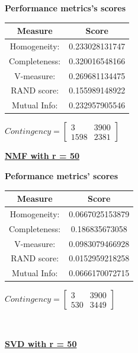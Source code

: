 \documentclass{report}
\begin{document}
\begin{center}
	\textbf{Performance metrics's scores} \\ \vspace{10pt}
	\begin{tabular}{*{2}{c}}
		\toprule
		\textbf{Measure} & \textbf{Score} \\
		\midrule
		Homogeneity: & 0.233028131747 \\
		\midrule
		Completeness: & 0.320016548166 \\
		\midrule
		V-measure: 	& 0.269681134475 \\
		\midrule
		RAND score: & 0.155989148922 \\
		\midrule
		Mutual Info: & 0.232957905546 \\
		\bottomrule
	\end{tabular}
	\qquad
	$Contingency = \left[ \begin{array}{*{2}{c}}
		3 		& 3900 \\
		1598 	& 2381 
			\end{array}\right]
			$
\end{center}
\newpage

\underline{\textbf{NMF with r = 50}} 

\begin{center}
	\textbf{Peformance metrics' scores} \\ \vspace{10pt}	
	\begin{tabular}{*{2}{c}}
		\toprule
		\textbf{Measure} & \textbf{Score} \\	
		\midrule	
		Homogeneity: & 0.0667025153879 \\
		\midrule
		Completeness: & 0.186835673058 \\
		\midrule
		V-measure: & 0.0983079466928 \\
		\midrule
		RAND score: & 0.0152959218258 \\
		\midrule
		Mutual Info: & 0.0666170072715 \\
		\bottomrule
	\end{tabular}
	\qquad	
	$Contingency = \left[\begin{array}{*{2}{c}}
			3 	& 3900 \\
			530 & 3449 
				\end{array}\right]
		$
\end{center}
\\ \vspace{20pt}

\underline{\textbf{SVD with r = 50}} 
\end{document}
